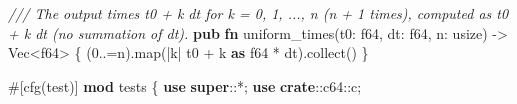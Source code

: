 \documentclass[
  10pt,
]{article}
\newenvironment{Shaded}{}{}
\newcommand{\AttributeTok}[1]{\textcolor[rgb]{0.49,0.56,0.16}{#1}}
\newcommand{\CommentTok}[1]{\textcolor[rgb]{0.38,0.63,0.69}{\textit{#1}}}
\newcommand{\DataTypeTok}[1]{\textcolor[rgb]{0.56,0.13,0.00}{#1}}
\newcommand{\DecValTok}[1]{\textcolor[rgb]{0.25,0.63,0.44}{#1}}
\newcommand{\KeywordTok}[1]{\textcolor[rgb]{0.00,0.44,0.13}{\textbf{#1}}}
\newcommand{\NormalTok}[1]{#1}
\newcommand{\OperatorTok}[1]{\textcolor[rgb]{0.40,0.40,0.40}{#1}}
\newcommand{\PreprocessorTok}[1]{\textcolor[rgb]{0.74,0.48,0.00}{#1}}
\begin{document}
\begin{Shaded}
\begin{Highlighting}[]
\CommentTok{/// The output times t0 + k dt for k = 0, 1, ..., n (n + 1 times), computed as t0 + k dt (no summation of dt).}
\KeywordTok{pub} \KeywordTok{fn}\NormalTok{ uniform\_times(t0}\OperatorTok{:} \DataTypeTok{f64}\OperatorTok{,}\NormalTok{ dt}\OperatorTok{:} \DataTypeTok{f64}\OperatorTok{,}\NormalTok{ n}\OperatorTok{:} \DataTypeTok{usize}\NormalTok{) }\OperatorTok{{-}\textgreater{}} \DataTypeTok{Vec}\OperatorTok{\textless{}}\DataTypeTok{f64}\OperatorTok{\textgreater{}} \OperatorTok{\{}
\NormalTok{    (}\DecValTok{0}\OperatorTok{..=}\NormalTok{n)}\OperatorTok{.}\NormalTok{map(}\OperatorTok{|}\NormalTok{k}\OperatorTok{|}\NormalTok{ t0 }\OperatorTok{+}\NormalTok{ k }\KeywordTok{as} \DataTypeTok{f64} \OperatorTok{*}\NormalTok{ dt)}\OperatorTok{.}\NormalTok{collect()}
\OperatorTok{\}}

\AttributeTok{\#[}\NormalTok{cfg}\AttributeTok{(}\NormalTok{test}\AttributeTok{)]}
\KeywordTok{mod}\NormalTok{ tests }\OperatorTok{\{}
    \KeywordTok{use} \KeywordTok{super}\PreprocessorTok{::}\OperatorTok{*;}
    \KeywordTok{use} \KeywordTok{crate}\PreprocessorTok{::c64::}\NormalTok{c}\OperatorTok{;}


\end{Highlighting}
\end{Shaded}
\end{document}
